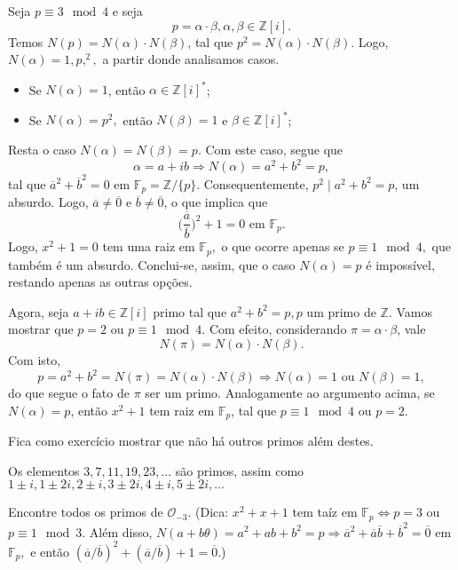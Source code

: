 \documentclass[AlgebraII/algebraII_notes.tex]{subfiles}
\begin{document}
\begin{proof*}
	Seja \(p\equiv 3\mod 4\) e seja
	\[
		p = \alpha \cdot \beta , \alpha , \beta \in \mathbb{Z}[i].
	\]
	Temos \(N(p) = N(\alpha )\cdot N(\beta )\), tal que \(p^{2} = N(\alpha )\cdot N(\beta )\). Logo,
	\(N(\alpha ) = 1, p, ^{2},\) a partir donde analisamos casos.
	\begin{itemize}
		\item Se \(N(\alpha ) = 1\), então \(\alpha \in \mathbb{Z}[i]^{*}\);
		\item Se \(N(\alpha ) = p^{2},\) então \(N(\beta ) = 1\) e \(\beta \in \mathbb{Z}[i]^{*}\);
	\end{itemize}
	Resta o caso \(N(\alpha ) = N(\beta ) = p.\) Com este caso, segue que
	\[
		\alpha = a + ib \Rightarrow N(\alpha ) = a^{2} + b^{2} = p,
	\]
	tal que \(\overline{a}^{2} + \overline{b}^{2} = 0\) em \(\mathbb{F}_{p} = \mathbb{Z}/\{p\}\). Consequentemente,
	\(p^{2}\mid a^{2}+b^{2} = p\), um absurdo. Logo, \(\overline{a}\neq \overline{0}\) e \(\overline{b}\neq \overline{0}\), o que implica que
	\[
		\biggl(\frac{\overline{a}}{\overline{b}}\biggr)^{2} + 1 = 0 \text{ em } \mathbb{F}_{p}.
	\]
	Logo, \(x^{2} + 1 = 0\) tem uma raiz em \(\mathbb{F}_{p},\) o que ocorre apenas se \(p\equiv 1 \mod 4,\) que também
	é um absurdo. Conclui-se, assim, que o caso \(N(\alpha ) = p\) é impossível, restando apenas as outras opções.

	Agora, seja \(a+ib\in \mathbb{Z}[i]\) primo tal que \(a^{2} + b^{2} = p, p\) um primo de \(\mathbb{Z}.\)
	Vamos mostrar que \(p = 2\) ou \(p\equiv 1\mod 4\). Com efeito, considerando \(\pi  = \alpha \cdot \beta \), vale
	\[
		N(\pi ) = N(\alpha )\cdot N(\beta ).
	\]
	Com isto,
	\[
		p = a^{2} + b^{2} = N(\pi) = N(\alpha )\cdot N(\beta ) \Rightarrow N(\alpha ) = 1 \text{ ou } N(\beta ) = 1,
	\]
	do que segue o fato de \(\pi \) ser um primo. Analogamente ao argumento acima, se \(N(\alpha ) = p\), então \(x^{2} + 1\) tem raiz em \(\mathbb{F}_{p}\),
	tal que \(p\equiv 1 \mod 4\) ou \(p = 2\).

	Fica como exercício mostrar que não há outros primos além destes. \qedsymbol
\end{proof*}
\begin{example}
	Os elementos \(3, 7, 11, 19, 23, \dotsc\) são primos, assim como \(1\pm i, 1\pm 2i, 2\pm i, 3\pm 2i, 4\pm i, 5\pm 2i, \dotsc\)
\end{example}
\begin{example}[Exercício]
	Encontre todos os primos de \(\mathcal{O}_{-3}\). (Dica: \(x^{2}+x+1\) tem taíz em
	\(\mathbb{F}_{p} \Longleftrightarrow p = 3\) ou \(p\equiv 1\mod 3.\) Além disso, \(N(a + b\theta )
	= a^{2} + ab + b^{2} = p \Rightarrow \overline{a}^{2} + \overline{a}\overline{b} + \overline{b}^{2} = \overline{0}\)
	em \(\mathbb{F}_{p},\) e então \((\overline{a}/\overline{b})^{2} + (\overline{a}/\overline{b}) + 1 = \overline{0}.\))
\end{example}
\end{document}
